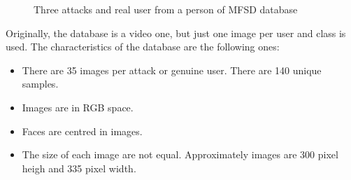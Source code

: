 \begin{figure}[htb]
\centering
{}

\caption{Three attacks and  real user from a person of MFSD database } \label{fig:mfsd}
\end{figure}


Originally, the database is a video one, but just one image per user and class is used. The characteristics of the database are the following ones:\\
\begin{itemize}
\item There are 35 images per attack or genuine user. There are 140 unique samples.
\item Images are in RGB space.
\item Faces are centred in images.
\item The size of each image are not equal. Approximately images are 300 pixel heigh and 335 pixel width.
\end{itemize}


